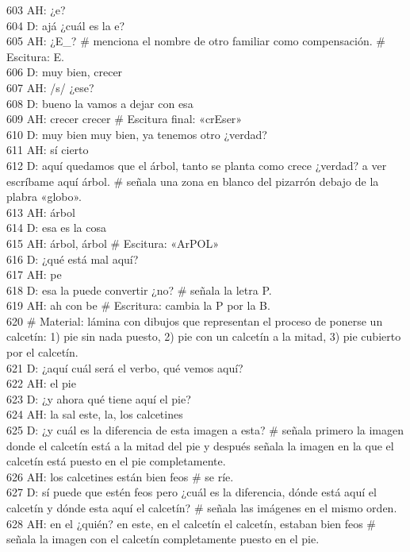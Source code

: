 603 AH: ¿e?\\
604 D: ajá ¿cuál es la e?\\
605 AH: ¿E\_? \# menciona el nombre de otro familiar como compensación. \# Escitura: E.\\
606 D: muy bien, crecer\\
607 AH: /s/ ¿ese?\\
608 D: bueno la vamos a dejar con esa\\
609 AH: crecer crecer \# Escitura final: «crEser»\\
610 D: muy bien muy bien, ya tenemos otro ¿verdad?\\
611 AH: sí cierto\\
612 D: aquí quedamos que el árbol, tanto se planta como crece ¿verdad? a ver escríbame aquí árbol. \# señala una zona en blanco del pizarrón debajo de la plabra «globo».\\
613 AH: árbol\\
614 D: esa es la cosa\\
615 AH: árbol, árbol \# Escitura: «ArPOL»\\
616 D: ¿qué está mal aquí?\\
617 AH: pe\\
618 D: esa la puede convertir ¿no? \# señala la letra P.\\
619 AH: ah con be \# Escritura: cambia la P por la B.\\
620 \# Material: lámina con dibujos que representan el proceso de ponerse un calcetín: 1) pie sin nada puesto, 2) pie con un calcetín a la mitad, 3) pie cubierto por el calcetín.\\
621 D: ¿aquí cuál será el verbo, qué vemos aquí?\\
622 AH: el pie\\
623 D: ¿y ahora qué tiene aquí el pie?\\
624 AH: la sal este, la, los calcetines\\
625 D: ¿y cuál es la diferencia de esta imagen a esta? \# señala primero la imagen donde el calcetín está a la mitad del pie y después señala la imagen en la que el calcetín está puesto en el pie completamente.\\
626 AH: los calcetines están bien feos \# se ríe.\\
627 D: sí puede que estén feos pero ¿cuál es la diferencia, dónde está aquí el calcetín y dónde esta aquí el calcetín? \# señala las imágenes en el mismo orden.\\
628 AH: en el ¿quién? en este, en el calcetín el calcetín, estaban bien feos \# señala la imagen con el calcetín completamente puesto en el pie.\\

